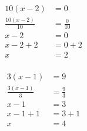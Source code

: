 \documentclass[12pt]{article}
\newcounter{minipagecount}
\begin{document}
\begin{multicols}{2}
\begin{minipage}[t]{0.45\textwidth}
    \raggedright %
    \begin{align*} %
        10(x - 2) &= 0\\
        \frac{10(x-2)}{10} &= \frac{0}{10}\\
        x - 2 &= 0\\
        x - 2 + 2 &= 0 + 2\\
        x &= 2\\
    \end{align*}
\end{minipage} %
\noindent{(\theminipagecount)}\hspace{0.1mm} %
\begin{minipage}[t]{0.45\textwidth} %
    \vspace{-26pt}  %
    \raggedright %
    \begin{align*} %
        3(x - 1) &= 9\\
        \frac{3(x-1)}{3} &= \frac{9}{3}\\
        x - 1 &= 3\\
        x - 1 + 1 &= 3 + 1\\
        x &= 4\\
    \end{align*}
\end{minipage}\columnbreak
\noindent{(\theminipagecount)}\hspace{0.1mm} %
\begin{minipage}[t]{0.45\textwidth} %
    \vspace{-26pt}  %

\end{minipage}
\end{multicols}
\end{document}
